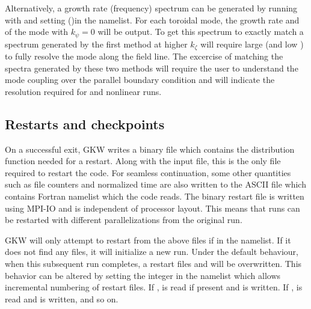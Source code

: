Alternatively, a growth rate (frequency) spectrum can be generated by running with  and setting
 ()in the  namelist.  For each toroidal mode,
the growth rate and of the mode with $k_\psi=0$ will be output.  To get this spectrum to exactly match a spectrum
generated by the first method at higher $k_\zeta$ will require large  (and low ) to fully resolve 
the mode along the field line.  The excercise of matching the spectra generated by these two methods
will require the user to understand the mode coupling over the parallel boundary condition
and will indicate the  resolution required for  and nonlinear runs.

\pagebreak

\subsection{Restarts \label{sec.restart} and checkpoints}

On a successful exit, GKW writes a binary file  which
contains the distribution function needed for a restart.  Along with the
input file, this is the only file required to restart the code.  
For seamless continuation, some other quantities such as file counters 
and normalized time are also written to the ASCII file  which
contains Fortran namelist which the code reads.   The binary restart file 
is written using MPI-IO and is independent of processor layout.  This means that
runs can be restarted with different parallelizations from the original run.

GKW will only attempt to restart from the above files if  in the 
namelist.  If it does not find any files, it will initialize a new run.  Under the default behaviour,
when this subsequent run completes, a restart files  and  will be overwritten.
This behavior can be altered by setting the integer  in the  namelist which
allows incremental numbering of restart files.  If ,  
 is read if present and  is written.   If ,  
 is read and  is written, and so on.

